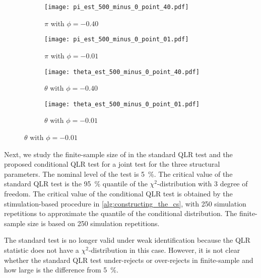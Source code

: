 \begin{figure}[htb]
  
  \caption[Parameter Estimates' \textit{t}-Statistics]{Parameter Estimates' $t$-Statistics}
  \label{fig:sim_parameter_estimates}


  \begin{subfigure}[t]{.48\textwidth}
    \caption[pi with phi = -0.40]{$\pi$ with $\phi = -0.40$}
    \texttt{[image: pi\_est\_500\_minus\_0\_point\_40.pdf]}
  \end{subfigure}
%
  \hfill
%
  \begin{subfigure}[t]{.48\textwidth}
    \caption[pi with phi = -0.01]{$\pi$ with $\phi = -0.01$}
    \texttt{[image: pi\_est\_500\_minus\_0\_point\_01.pdf]}
  \end{subfigure}
%
  \begin{subfigure}[b]{.48\textwidth}
    \caption[theta with phi = -0.40]{$\theta$ with $\phi = -0.40$}
    \texttt{[image: theta\_est\_500\_minus\_0\_point\_40.pdf]}
  \end{subfigure}
%
  \hfill
%
  \begin{subfigure}[b]{.48\textwidth}
    \caption[theta with phi = -0.01]{$\theta$ with $\phi = -0.01$}
    \texttt{[image: theta\_est\_500\_minus\_0\_point\_01.pdf]}
  \end{subfigure}
%
\end{figure}

Next, we study the finite-sample size of in the standard QLR test and the proposed conditional QLR test for a joint test for the three structural parameters. The nominal level of the test is \SI{5}{\percent}. The critical value of the standard QLR test is the \SI{95}{\percent} quantile of the $\chi^2$-distribution with $3$ degree of freedom. The critical value of the conditional QLR test is obtained by the stimulation-based procedure in \cref{alg:constructing_the_cs}, with \num{250} simulation repetitions to approximate the quantile of the conditional distribution. The finite-sample size is based on \num{250} simulation repetitions.

The standard test is no longer valid under weak identification because the QLR statistic does not have a $\chi^2$-distribution in this case. However, it is not clear whether the standard QLR test under-rejects or over-rejects in finite-sample and how large is the difference from \SI{5}{\percent}. 


